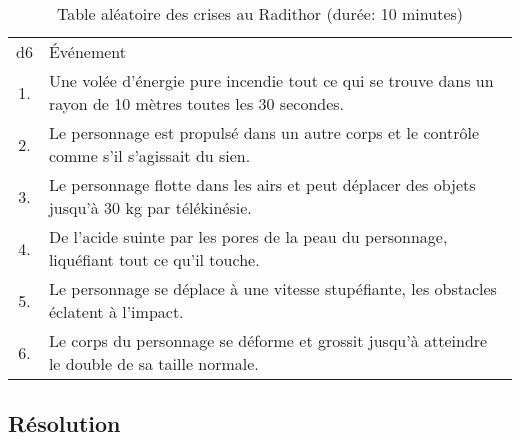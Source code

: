 \begin{table}
	\caption{Table aléatoire des crises au Radithor (durée: 10 minutes)}
	\label{table:radithor}
	\begin{tabularx}{0.9\textwidth}{cX}
	d6 & Événement\\
	1. & Une volée d'énergie pure incendie tout ce qui se trouve dans un rayon de 10 mètres toutes les 30 secondes.\\
	2. & Le personnage est propulsé dans un autre corps et le contrôle comme s'il s'agissait du sien.\\
	3. & Le personnage flotte dans les airs et peut déplacer des objets jusqu'à 30 kg par télékinésie.\\
	4. & De l'acide suinte par les pores de la peau du personnage, liquéfiant tout ce qu'il touche.\\
	5. & Le personnage se déplace à une vitesse stupéfiante, les obstacles éclatent à l'impact.\\
	6. & Le corps du personnage se déforme et grossit jusqu'à atteindre le double de sa taille normale.\\
	\end{tabularx}
\end{table}

\subsection{Résolution}
